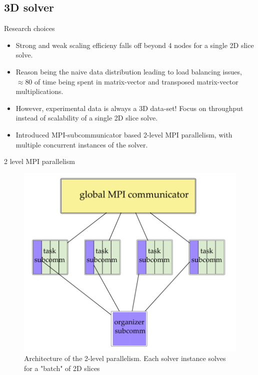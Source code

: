 \documentclass{beamer}
\begin{document}
\subsection{3D solver}
\begin{frame}{Research choices}
	\begin{itemize}
		\item Strong and weak scaling efficieny falls off beyond 4 nodes for a single 2D slice solve. 
		\item Reason being the naive data distribution leading to load balancing issues, $\approx80$ of time being spent in matrix-vector and transposed matrix-vector multiplications. 
		\item However, experimental data is always a 3D data-set! Focus on throughput instead of scalability of a single 2D slice solve. 
		\item Introduced MPI-subcommunicator based 2-level MPI parallelism, with multiple concurrent instances of the solver.
	\end{itemize}
\end{frame}

\begin{frame}{2 level MPI parallelism}
	\begin{center}
		\begin{figure}
			\hspace*{-1cm}\includegraphics[scale=0.3125]{figures/2level1.png}
			\caption{Architecture of the 2-level parallelism. Each solver instance solves for a "batch" of 2D slices}
		\end{figure}
	\end{center}
\end{frame}
\end{document}
